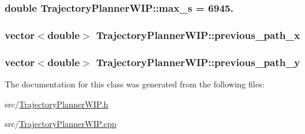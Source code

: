 \subsubsection[{\texorpdfstring{max\+\_\+s}{max_s}}]{\setlength{\rightskip}{0pt plus 5cm}double Trajectory\+Planner\+W\+I\+P\+::max\+\_\+s = 6945.\hspace{0.3cm}{\ttfamily [protected]}}\hypertarget{classTrajectoryPlannerWIP_a43501cae77daf85f811ed0873d9bf960}{}\label{classTrajectoryPlannerWIP_a43501cae77daf85f811ed0873d9bf960}
\subsubsection[{\texorpdfstring{previous\+\_\+path\+\_\+x}{previous_path_x}}]{\setlength{\rightskip}{0pt plus 5cm}vector$<$double$>$ Trajectory\+Planner\+W\+I\+P\+::previous\+\_\+path\+\_\+x}\hypertarget{classTrajectoryPlannerWIP_a74997cfa081e6d4409d4d2234e5b3855}{}\label{classTrajectoryPlannerWIP_a74997cfa081e6d4409d4d2234e5b3855}
\subsubsection[{\texorpdfstring{previous\+\_\+path\+\_\+y}{previous_path_y}}]{\setlength{\rightskip}{0pt plus 5cm}vector$<$double$>$ Trajectory\+Planner\+W\+I\+P\+::previous\+\_\+path\+\_\+y}\hypertarget{classTrajectoryPlannerWIP_a32a8ed201b7abf6a5817e17ba5e4fca3}{}\label{classTrajectoryPlannerWIP_a32a8ed201b7abf6a5817e17ba5e4fca3}


The documentation for this class was generated from the following files\+:\begin{DoxyCompactItemize}
\item 
src/\hyperlink{TrajectoryPlannerWIP_8h}{Trajectory\+Planner\+W\+I\+P.\+h}\item 
src/\hyperlink{TrajectoryPlannerWIP_8cpp}{Trajectory\+Planner\+W\+I\+P.\+cpp}\end{DoxyCompactItemize}
